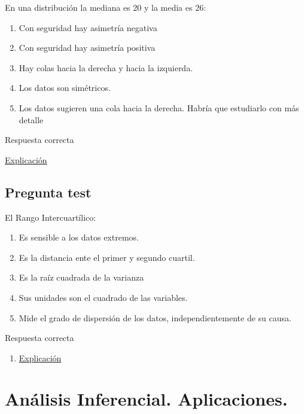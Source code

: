 \documentclass[
]{book}
\providecommand{\tightlist}{%
  \setlength{\itemsep}{0pt}\setlength{\parskip}{0pt}}
\begin{document}
En una distribución la mediana es 20 y la media es 26:

\begin{enumerate}
\def\labelenumi{\alph{enumi})}
\tightlist
\item
  Con seguridad hay asimetría negativa
\item
  Con seguridad hay asimetría positiva
\item
  Hay colas hacia la derecha y hacia la izquierda.
\item
  Los datos son simétricos.
\item
  Los datos sugieren una cola hacia la derecha. Habría que estudiarlo con más detalle
\end{enumerate}

Respuesta correcta

\href{https://1fjmanzano.github.io/bioestadistica/medidas-de-forma.html}{Explicación}

\hypertarget{pregunta-test-65}{%
\section{Pregunta test}\label{pregunta-test-65}}

El Rango Intercuartílico:

\begin{enumerate}
\def\labelenumi{\alph{enumi})}
\tightlist
\item
  Es sensible a los datos extremos.
\item
  Es la distancia ente el primer y segundo cuartil.
\item
  Es la raíz cuadrada de la varianza
\item
  Sus unidades son el cuadrado de las variables.
\item
  Mide el grado de dispersión de los datos, independientemente de su causa.
\end{enumerate}

Respuesta correcta

\begin{enumerate}
\def\labelenumi{\alph{enumi})}
\setcounter{enumi}{4}
\tightlist
\item
  \href{https://1fjmanzano.github.io/bioestadistica/medidas-de-posicio\%CC\%81n-dispersio\%CC\%81n-y-forma.html\#medidas-de-dispersio\%CC\%81n}{Explicación}
\end{enumerate}

\hypertarget{anuxe1lisis-inferencial.-aplicaciones.}{%
\chapter{Análisis Inferencial. Aplicaciones.}\label{anuxe1lisis-inferencial.-aplicaciones.}}
\end{document}
